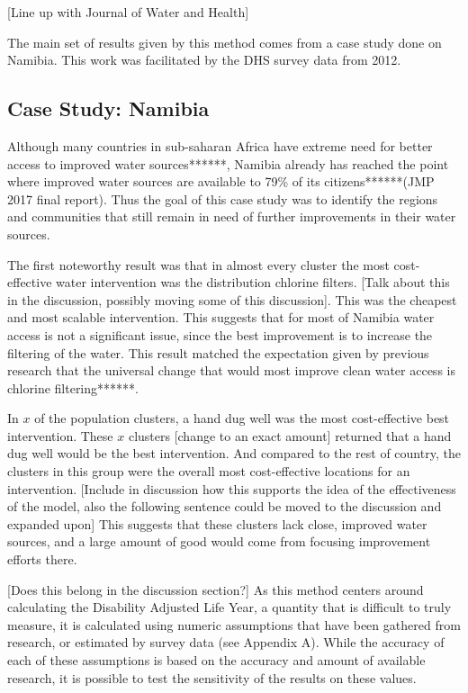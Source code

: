 [Line up with Journal of Water and Health]

The main set of results given by this method comes from a case study done on Namibia. This work was facilitated by the DHS survey data from 2012.

\subsection{Case Study: Namibia}

Although many countries in sub-saharan Africa have extreme need for better access to improved water sources******,  Namibia already has reached the point where improved water sources are available to 79\% of its citizens******(JMP 2017 final report).
Thus the goal of this case study was to identify the regions and communities that still remain in need of further improvements in their water sources.  

The first noteworthy result was that in almost every cluster the most cost-effective water intervention was the distribution chlorine filters. [Talk about this in the discussion, possibly moving some of this discussion].
This was the cheapest and most scalable intervention.
This suggests that for most of Namibia water access is not a significant issue, since the best improvement is to increase the filtering of the water.
This result matched the expectation given by previous research that the universal change that would most improve clean water access is chlorine filtering******.

In $x$ of the population clusters, a hand dug well was the most cost-effective best intervention.
These $x$ clusters [change to an exact amount] returned that a hand dug well would be the best intervention.
And compared to the rest of country, the clusters in this group were the overall most cost-effective locations for an intervention. 
[Include in discussion how this supports the idea of the effectiveness of the model, also the following sentence could be moved to the discussion and expanded upon]
This suggests that these clusters lack close, improved water sources, and a large amount of good would come from focusing improvement efforts there.

[Does this belong in the discussion section?]
As this method centers around calculating the Disability Adjusted Life Year, a quantity that is difficult to truly measure, it is calculated using numeric assumptions that have been gathered from research, or estimated by survey data (see Appendix A).
While the accuracy of each of these assumptions is based on the accuracy and amount of available research, it is possible to test the sensitivity of the results on these values.

